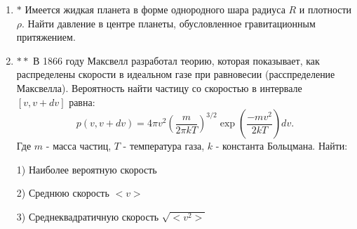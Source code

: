 \begin{enumerate}
    \item $\boldsymbol{*}$ Имеется жидкая планета в форме однородного шара радиуса $R$ и плотности $\rho$. Найти давление в центре планеты, обусловленное гравитационным притяжением.
    \item $\boldsymbol{**}$ В 1866 году Максвелл разработал теорию, которая показывает, как распределены скорости в идеальном газе при равновесии (расспределение Максвелла). Вероятность найти частицу со скоростью в интервале $[v, v+dv]$ равна:
    \[
    p(v, v+dv) = 4\pi v^2 \left( \frac{m}{2\pi kT} \right)^{3/2} \exp \left( \frac{-mv^2}{2kT} \right) dv.
    \]
    Где $m$ - масса частиц, $T$ - температура газа, $k$ - константа Больцмана. Найти:

\begin{small}
    1) Наиболее вероятную скорость
        
    2) Среднюю скорость $<v>$      
    
    3) Среднеквадратичную скорость  $\sqrt{<v^2>}$ 
\end{small}
       
\end{enumerate}